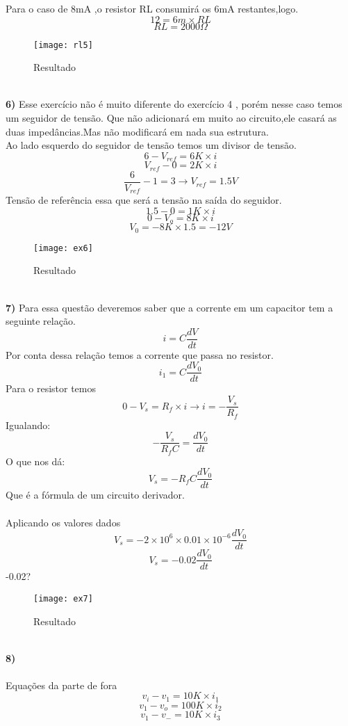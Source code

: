 \documentclass[11pt,a4paper]{article}
\begin{document}
Para o caso de 8mA ,o resistor RL consumirá os 6mA restantes,logo.
$$12=6m\times RL$$
$$RL=2000 \Omega$$
\begin{figure}[!h]
\begin{center}
\texttt{[image: rl5]}
\caption{Resultado}
\end{center}
\end{figure}
\\
\newpage
\textbf{6) }
Esse exercício não é muito diferente do exercício 4 , porém nesse caso temos um seguidor de tensão. Que não adicionará em muito ao circuito,ele casará as duas impedâncias.Mas não modificará em nada sua estrutura.\\
Ao lado esquerdo do seguidor de tensão temos um divisor de tensão.\\

$$6-V_{ref}=6K\times i$$
$$V_{ref}-0=2K\times i$$
$$\frac{6}{V_{ref}}-1=3\rightarrow V_{ref}=1.5 V$$
Tensão de referência essa que será a tensão na saída do seguidor.\\
$$1.5-0=1K \times i$$
$$0-V_o=8K\times i$$
$$V_0=-8K\times 1.5 = -12V$$
\begin{figure}[!h]
\begin{center}
\texttt{[image: ex6]}
\caption{Resultado}
\end{center}
\end{figure}
\\
\newpage
\textbf{7) }
Para essa questão deveremos saber que a corrente em um capacitor tem a seguinte relação.
$$i=C\frac{dV}{dt}$$
Por conta dessa relação temos a corrente que passa no resistor.
$$ i_1=C\frac{dV_0}{dt} $$
Para o resistor temos
$$0-V_s=R_f\times i\rightarrow i=-\frac{V_s}{R_f}$$
Igualando:
$$-\frac{V_s}{R_fC}=\frac{dV_0}{dt}$$
O que nos dá:
$$V_s=-R_fC \frac{dV_0}{dt}$$
Que é a fórmula de um circuito derivador.\\\\
Aplicando os valores dados 
$$V_s=-2\times 10^6 \times 0.01\times 10^{-6} \frac{dV_0}{dt}$$
$$V_s=-0.02\frac{dV_0}{dt}$$
-0.02?
\begin{figure}[!h]
\begin{center}
\texttt{[image: ex7]}
\caption{Resultado}
\end{center}
\end{figure}
\\
\textbf{8) }\\\\
Equações da parte de fora
$$v_i-v_1=10K\times i_1$$
$$v_1-v_o=100K\times i_2$$
$$v_1-v_-=10K\times i_3$$
\end{document}
